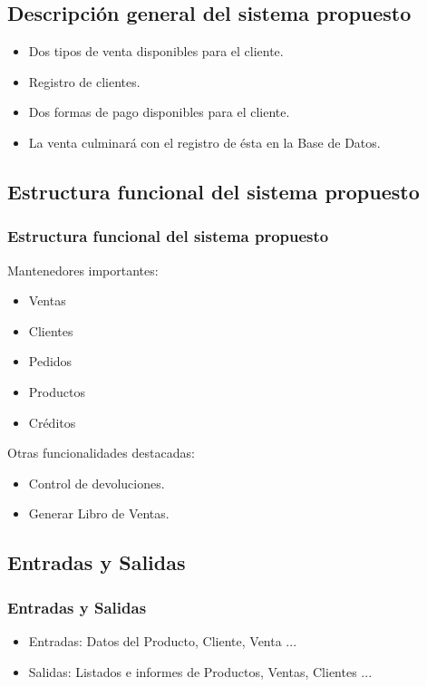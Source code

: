 \documentclass{beamer}
\begin{document}
\subsection{Descripción general del sistema propuesto}

\begin{frame}
\begin{itemize}
\frametitle{Descripción general del sistema propuesto}
\item Dos tipos de venta disponibles para el cliente. \pause
\item Registro de clientes. \pause
\item Dos formas de pago disponibles para el cliente. \pause
\item La venta culminará con el registro de ésta en la Base de Datos.
\end{itemize}
\end{frame}

\subsection{Estructura funcional del sistema propuesto}

\begin{frame}
\frametitle{Estructura funcional del sistema propuesto}
Mantenedores importantes: 
\begin{itemize}
\item Ventas
\item Clientes 
\item Pedidos 
\item Productos 
\item Créditos 
\end{itemize}
\end{frame}

\begin{frame}
Otras funcionalidades destacadas: 
\begin{itemize}
\item Control de devoluciones. \pause
\item Generar Libro de Ventas.
\end{itemize}
\end{frame}

\subsection{Entradas y Salidas}

\begin{frame}
\frametitle{Entradas y Salidas}
\begin{itemize}
\item Entradas: Datos del Producto, Cliente, Venta ... \pause
\item Salidas: Listados e informes de Productos, Ventas, Clientes ... 
\end{itemize}
\end{frame}
\end{document}
